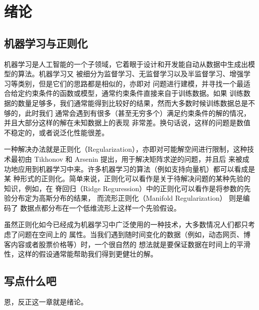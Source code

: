 \chapter{绪论}

\section{机器学习与正则化}

机器学习是人工智能的一个子领域，它着眼于设计和开发能自动从数据中生成出模型的算法。机器学习又
被细分为监督学习、无监督学习以及半监督学习、增强学习等类别，但是它们的思路都是相似的，亦即对
问题进行建模，并寻找一个最适合给定约束条件的函数或模型，通常约束条件直接来自于训练数据。如果
训练数据的数量足够多，我们通常能得到比较好的结果，然而大多数时候训练数据总是不够的，此时我们
通常会遇到有很多（甚至无穷多个）满足约束条件的解的情况，并且大部分这样的解在未知数据上的表现
非常差。换句话说，这样的问题是数值不稳定的，或者说泛化性能很差。

一种解决办法就是正则化（Regularization），亦即对可能解空间进行限制，这种技术最初由
Tikhonov 和 Arsenin \cite{tikhomirov1960dsf} 提出，用于解决矩阵求逆的问题，并且后
来被成功地应用到机器学习中来。许多机器学习的算法（例如支持向量机）都可以看成是某
种形式的正则化。简单来说，正则化可以看作是关于待解决问题的某种先验的知识，例如，在
脊回归（Ridge Reguression）中的正则化可以看作是将参数的先验分布定为高斯分布的结果，
而流形正则化（Manifold Regularization）\cite{On-Manifold-Regularization} 则是编码了
数据点都分布在一个低维流形上这样一个先验假设。

虽然正则化如今已经成为机器学习中广泛使用的一种技术，大多数情况人们都只考虑了问题在空间上的
属性。当我们遇到随时间变化的数据（例如，动态网页、博客内容或者股票价格等）时，一个很自然的
想法就是要保证数据在时间上的平滑性，这样的假设通常能帮助我们得到更健壮的解。

\section{写点什么吧}

恩，反正这一章就是绪论。
